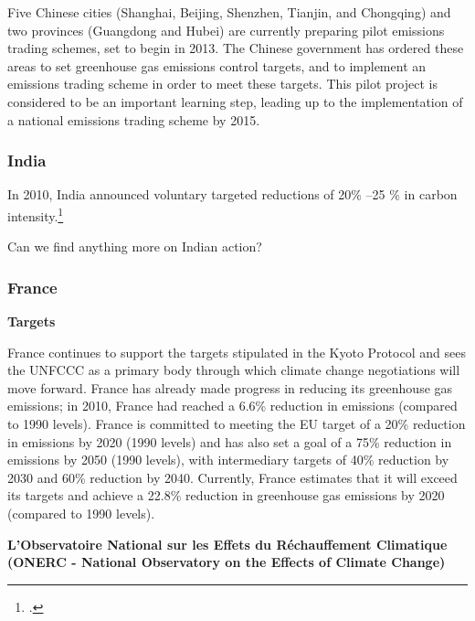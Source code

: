 Five Chinese cities (Shanghai, Beijing, Shenzhen, Tianjin, and Chongqing) and two provinces (Guangdong and Hubei) are currently preparing pilot emissions trading schemes, set to begin in 2013. 
The Chinese government has ordered these areas to set greenhouse gas emissions control targets, and to implement an emissions trading scheme in order to meet these targets. 
This pilot project is considered to be an important learning step, leading up to the implementation of a national emissions trading scheme by 2015.



	\subsubsection{India}



 In 2010, India announced voluntary targeted reductions of 20\% --25 \% in carbon intensity.\footcite[][p. 108]{UNHumanDev2013}

\begin{vcom}
Can we find anything more on Indian action?
\end{vcom}



	\subsubsection{France}
	

\textbf{Targets}



France continues to support the targets stipulated in the Kyoto Protocol and sees the UNFCCC as a primary body through which climate change negotiations will move forward. 
France has already made progress in reducing its greenhouse gas emissions; in 2010, France had reached a 6.6\% reduction in emissions (compared to 1990 levels). 
France is committed to meeting the EU target of a 20\% reduction in emissions by 2020 (1990 levels) and has also set a goal of a 75\% reduction in emissions by 2050 (1990 levels), with intermediary targets of 40\% reduction by 2030 and 60\% reduction by 2040.  
Currently, France estimates that it will exceed its targets and achieve a 22.8\% reduction in greenhouse gas emissions by 2020 (compared to 1990 levels).



\textbf{L’Observatoire National sur les Effets du Réchauffement Climatique (ONERC - National Observatory on the Effects of Climate Change)}



